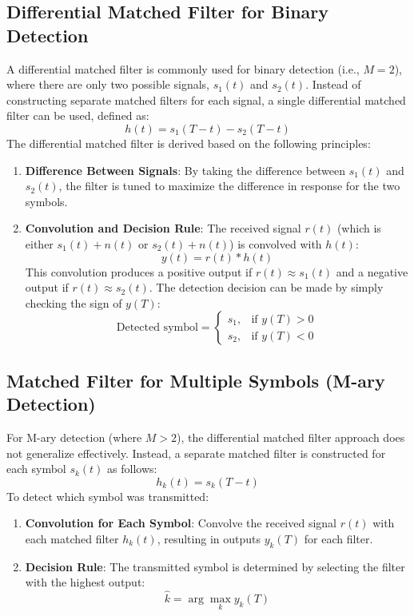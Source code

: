 \documentclass[10pt]{article}
\begin{document}
\subsection{Differential Matched Filter for Binary Detection}
A differential matched filter is commonly used for binary detection (i.e., \( M = 2 \)), where there are only two possible signals, \( s_1(t) \) and \( s_2(t) \). Instead of constructing separate matched filters for each signal, a single differential matched filter can be used, defined as:
\[
h(t) = s_1(T - t) - s_2(T - t)
\]
The differential matched filter is derived based on the following principles:
\begin{enumerate}
    \item \textbf{Difference Between Signals}: By taking the difference between \( s_1(t) \) and \( s_2(t) \), the filter is tuned to maximize the difference in response for the two symbols.
    \item \textbf{Convolution and Decision Rule}: The received signal \( r(t) \) (which is either \( s_1(t) + n(t) \) or \( s_2(t) + n(t) \)) is convolved with \( h(t) \):
    \[
    y(t) = r(t) * h(t)
    \]
    This convolution produces a positive output if \( r(t) \approx s_1(t) \) and a negative output if \( r(t) \approx s_2(t) \). The detection decision can be made by simply checking the sign of \( y(T) \):
    \[
    \text{Detected symbol} =
    \begin{cases}
        s_1, & \text{if } y(T) > 0 \\
        s_2, & \text{if } y(T) < 0
    \end{cases}
    \]
\end{enumerate}

\subsection{Matched Filter for Multiple Symbols (M-ary Detection)}
For M-ary detection (where \( M > 2 \)), the differential matched filter approach does not generalize effectively. Instead, a separate matched filter is constructed for each symbol \( s_k(t) \) as follows:
\[
h_k(t) = s_k(T - t)
\]
To detect which symbol was transmitted:
\begin{enumerate}
    \item \textbf{Convolution for Each Symbol}: Convolve the received signal \( r(t) \) with each matched filter \( h_k(t) \), resulting in outputs \( y_k(T) \) for each filter.
    \item \textbf{Decision Rule}: The transmitted symbol is determined by selecting the filter with the highest output:
    \[
    \hat{k} = \arg \max_{k} y_k(T)
    \]
\end{enumerate}
\end{document}
